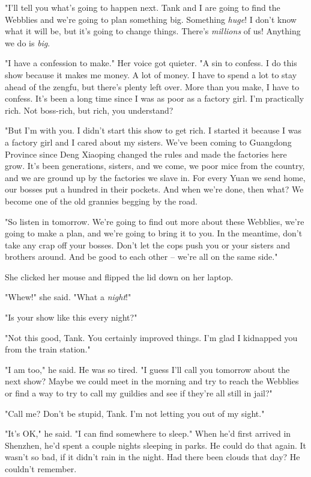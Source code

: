"I'll tell you what's going to happen next. Tank and I are going to
find the Webblies and we're going to plan something big. Something
\emph{huge}! I don't know what it will be, but it's going to change
things. There's \emph{millions} of us! Anything we do is
\emph{big}.

"I have a confession to make." Her voice got quieter. "A sin to
confess. I do this show because it makes me money. A lot of money.
I have to spend a lot to stay ahead of the zengfu, but there's
plenty left over. More than you make, I have to confess. It's been
a long time since I was as poor as a factory girl. I'm practically
rich. Not boss-rich, but rich, you understand?

"But I'm with you. I didn't start this show to get rich. I started
it because I was a factory girl and I cared about my sisters. We've
been coming to Guangdong Province since Deng Xiaoping changed the
rules and made the factories here grow. It's been generations,
sisters, and we come, we poor mice from the country, and we are
ground up by the factories we slave in. For every Yuan we send
home, our bosses put a hundred in their pockets. And when we're
done, then what? We become one of the old grannies begging by the
road.

"So listen in tomorrow. We're going to find out more about these
Webblies, we're going to make a plan, and we're going to bring it
to you. In the meantime, don't take any crap off your bosses. Don't
let the cops push you or your sisters and brothers around. And be
good to each other -- we're all on the same side."

She clicked her mouse and flipped the lid down on her laptop.

"Whew!" she said. "What a \emph{night}!"

"Is your show like this every night?"

"Not this good, Tank. You certainly improved things. I'm glad I
kidnapped you from the train station."

"I am too," he said. He was so tired. "I guess I'll call you
tomorrow about the next show? Maybe we could meet in the morning
and try to reach the Webblies or find a way to try to call my
guildies and see if they're all still in jail?"

"Call me? Don't be stupid, Tank. I'm not letting you out of my
sight."

"It's OK," he said. "I can find somewhere to sleep." When he'd
first arrived in Shenzhen, he'd spent a couple nights sleeping in
parks. He could do that again. It wasn't so bad, if it didn't rain
in the night. Had there been clouds that day? He couldn't
remember.


